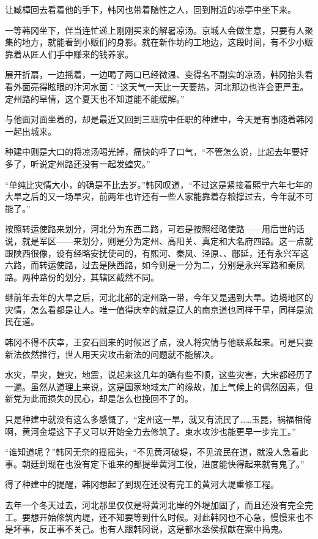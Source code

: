 让臧樟回去看着他的手下，韩冈也带着随性之人，回到附近的凉亭中坐下来。

一等韩冈坐下，伴当连忙递上刚刚买来的解暑凉汤。京城人会做生意，只要有人聚集的地方，就能看到小贩们的身影。就在新作坊的工地边，这段时间，有不少小贩靠着从匠人们手中赚来的钱养家。

展开折扇，一边摇着，一边喝了两口已经微温、变得名不副实的凉汤，韩冈抬头看看外面亮得眩眼的汴河水面：“这天气一天比一天要热，河北那边也许会更严重。定州路的旱情，这个夏天也不知道能不能缓解。”

与他面对面坐着的，却是最近又回到三班院中任职的种建中，今天是有事随着韩冈一起出城来。

种建中则是大口的将凉汤喝光掉，痛快的呼了口气，“不管怎么说，比起去年要好多了，听说定州路还没有一起发蝗灾。”

“单纯比灾情大小，的确是不比去岁。”韩冈叹道，“不过这是紧接着熙宁六年七年的大旱之后的又一场旱灾，前两年也许还有一些人家能靠着存粮撑过去，今年就不可能了。”

按照转运使路来划分，河北分为东西二路，可若是按照经略使路——用后世的话说，就是军区——来划分，则是分为定州、高阳关、真定和大名府四路。这一点就跟陕西很像，设有经略安抚使司的，有熙河、秦凤、泾原、、鄜延，还有永兴军这六路，而转运使路，过去是陕西路，如今则是一分为二，分别是永兴军路和秦凤路。两种路份的划分，其辖区截然不同。

继前年去年的大旱之后，河北北部的定州路一带，今年又是遇到大旱。边境地区的灾情，怎么看都是让人。唯一值得庆幸的就是辽人的南京道也同样干旱，同样是流民在道。

韩冈不得不庆幸，王安石回来的时候迟了点，没人将灾情与他联系起来。可是只要新法依然推行，世人用天灾攻击新法的问题就不能解决。

水灾，旱灾，蝗灾，地震，说起来这几年的确有些不顺，这些灾害，大宋都经历了一遍。虽然从道理上来说，这是国家地域太广的缘故，加上气候上的偶然因素，但新党为此而损失的民心，却是怎么也挽回不了的。

只是种建中就没有这么多感慨了，“定州这一旱，就又有流民了……玉昆，祸福相倚啊，黄河金堤这下子又可以开始全力去修筑了。束水攻沙也能更早一步完工。”

“谁知道呢？”韩冈无奈的摇摇头，“不见黄河破堤，不见流民在道，就没人急着此事。朝廷到现在也没有定下谁来的都提举黄河工役，进度能快得起来就有鬼了。”

得了种建中的提醒，韩冈想起了到现在还没有完工的黄河大堤重修工程。

去年一个冬天过去，河北那里仅仅是将黄河北岸的外堤加固了，而且还没有完全完工。要想开始修筑内堤，还不知要等到什么时候。对此韩冈也不心急，慢慢来也不是坏事，反正事不关己。也有人跟韩冈说，这是都水丞侯叔献在案中捣鬼。

